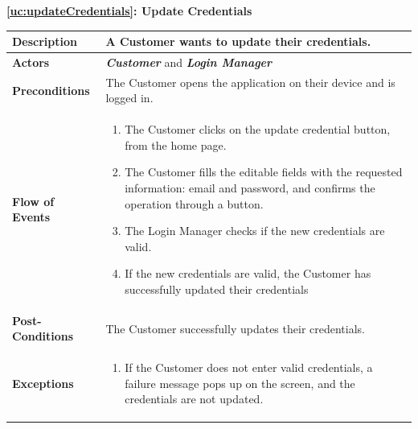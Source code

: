 \documentclass[a4paper, 12pt, oneside]{article}
\begin{document}
\begin{center}
{\textbf{\ref{uc:updateCredentials}: Update Credentials}}
\end{center}
\begin{tabularx}{\linewidth}{| l | X |}
    
    \hline
    \textbf{Description} & A Customer wants to update their credentials.\\
    

    \hline
    \textbf{Actors} & \textbf{\textit{Customer}} and \textit{\textbf{Login Manager}}\\
    
    \hline
    \textbf{Preconditions} & The Customer opens the application on their device and is logged in.\\
    
    \hline
    \textbf{Flow of Events} & \parbox{0.7\textwidth}{   
        \begin{enumerate}
            \item The Customer clicks on the update credential button, from the home page.
            \item The Customer fills the editable fields with the requested information: email and password, and confirms the operation through a button.
            \item The Login Manager checks if the new credentials are valid. 
            \item If the new credentials are valid, the Customer has successfully updated their credentials
    \end{enumerate}}\\
    
    \hline
    \textbf{Post-Conditions} & The Customer successfully updates their credentials.\\
    
    \hline
    \textbf{Exceptions} & \parbox{0.7\textwidth}{ \begin{enumerate}
            \item If the Customer does not enter valid credentials, a failure message pops up on the screen, and the credentials are not updated.
        \end{enumerate}}\\

    \hline
    
\end{tabularx}
\end{document}

